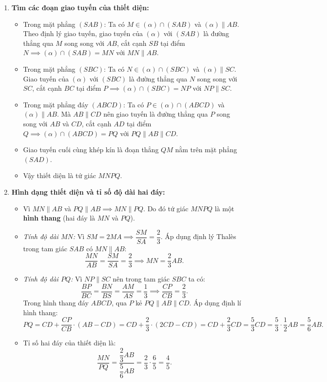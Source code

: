 \documentclass[12pt, a4paper]{article}
\begin{document}
\begin{enumerate}[leftmargin=0.6cm]
    \item \textbf{Tìm các đoạn giao tuyến của thiết diện:}
    \begin{itemize}
        \item Trong mặt phẳng $(SAB)$: Ta có $M \in (\alpha) \cap (SAB)$ và $(\alpha) \parallel AB$. Theo định lý giao tuyến, giao tuyến của $(\alpha)$ với $(SAB)$ là đường thẳng qua $M$ song song với $AB$, cắt cạnh $SB$ tại điểm $N \implies (\alpha) \cap (SAB) = MN$ với $MN \parallel AB$.
        \item Trong mặt phẳng $(SBC)$: Ta có $N \in (\alpha) \cap (SBC)$ và $(\alpha) \parallel SC$. Giao tuyến của $(\alpha)$ với $(SBC)$ là đường thẳng qua $N$ song song với $SC$, cắt cạnh $BC$ tại điểm $P \implies (\alpha) \cap (SBC) = NP$ với $NP \parallel SC$.
        \item Trong mặt phẳng đáy $(ABCD)$: Ta có $P \in (\alpha) \cap (ABCD)$ và $(\alpha) \parallel AB$. Mà $AB \parallel CD$ nên giao tuyến là đường thẳng qua $P$ song song với $AB$ và $CD$, cắt cạnh $AD$ tại điểm $Q \implies (\alpha) \cap (ABCD) = PQ$ với $PQ \parallel AB \parallel CD$.
        \item Giao tuyến cuối cùng khép kín là đoạn thẳng $QM$ nằm trên mặt phẳng $(SAD)$.
        \item Vậy thiết diện là tứ giác $MNPQ$.
    \end{itemize}

    \item \textbf{Hình dạng thiết diện và tỉ số độ dài hai đáy:}
    \begin{itemize}
        \item Vì $MN \parallel AB$ và $PQ \parallel AB \implies MN \parallel PQ$. Do đó tứ giác $MNPQ$ là một \textbf{hình thang} (hai đáy là $MN$ và $PQ$).
        \item \textit{Tính độ dài $MN$:} Vì $SM = 2MA \implies \dfrac{SM}{SA} = \dfrac{2}{3}$.
        Áp dụng định lý Thalès trong tam giác $SAB$ có $MN \parallel AB$:
        $$\dfrac{MN}{AB} = \dfrac{SM}{SA} = \dfrac{2}{3} \implies MN = \dfrac{2}{3} AB.$$
        \item \textit{Tính độ dài $PQ$:} Vì $NP \parallel SC$ nên trong tam giác $SBC$ ta có:
        $$\dfrac{BP}{BC} = \dfrac{BN}{BS} = \dfrac{AM}{AS} = \dfrac{1}{3} \implies \dfrac{CP}{CB} = \dfrac{2}{3}.$$
        Trong hình thang đáy $ABCD$, qua $P$ kẻ $PQ \parallel AB \parallel CD$. Áp dụng định lí hình thang:
        $$PQ = CD + \dfrac{CP}{CB} \cdot (AB - CD) = CD + \dfrac{2}{3} \cdot (2CD - CD) = CD + \dfrac{2}{3} CD = \dfrac{5}{3} CD = \dfrac{5}{3} \cdot \dfrac{1}{2} AB = \dfrac{5}{6} AB.$$
        \item Tỉ số hai đáy của thiết diện là:
        $$\dfrac{MN}{PQ} = \dfrac{\dfrac{2}{3} AB}{\dfrac{5}{6} AB} = \dfrac{2}{3} \cdot \dfrac{6}{5} = \dfrac{4}{5}.$$
    \end{itemize}
\end{enumerate}
\end{document}
